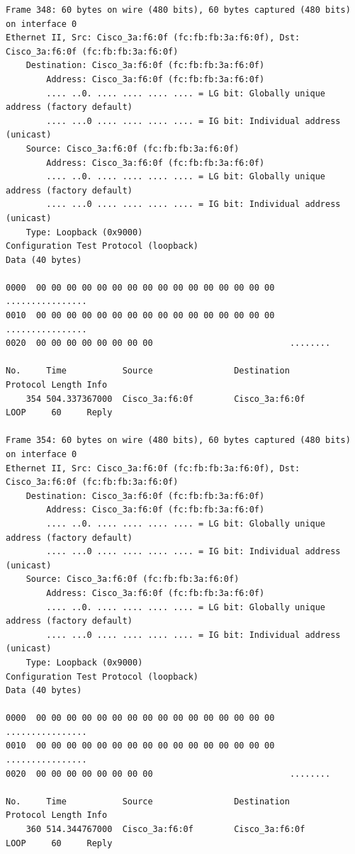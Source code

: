 \documentclass[a4paper,11pt]{article}
\begin{document}
\begin{lstlisting}
Frame 348: 60 bytes on wire (480 bits), 60 bytes captured (480 bits) on interface 0
Ethernet II, Src: Cisco_3a:f6:0f (fc:fb:fb:3a:f6:0f), Dst: Cisco_3a:f6:0f (fc:fb:fb:3a:f6:0f)
    Destination: Cisco_3a:f6:0f (fc:fb:fb:3a:f6:0f)
        Address: Cisco_3a:f6:0f (fc:fb:fb:3a:f6:0f)
        .... ..0. .... .... .... .... = LG bit: Globally unique address (factory default)
        .... ...0 .... .... .... .... = IG bit: Individual address (unicast)
    Source: Cisco_3a:f6:0f (fc:fb:fb:3a:f6:0f)
        Address: Cisco_3a:f6:0f (fc:fb:fb:3a:f6:0f)
        .... ..0. .... .... .... .... = LG bit: Globally unique address (factory default)
        .... ...0 .... .... .... .... = IG bit: Individual address (unicast)
    Type: Loopback (0x9000)
Configuration Test Protocol (loopback)
Data (40 bytes)

0000  00 00 00 00 00 00 00 00 00 00 00 00 00 00 00 00   ................
0010  00 00 00 00 00 00 00 00 00 00 00 00 00 00 00 00   ................
0020  00 00 00 00 00 00 00 00                           ........

No.     Time           Source                Destination           Protocol Length Info
    354 504.337367000  Cisco_3a:f6:0f        Cisco_3a:f6:0f        LOOP     60     Reply

Frame 354: 60 bytes on wire (480 bits), 60 bytes captured (480 bits) on interface 0
Ethernet II, Src: Cisco_3a:f6:0f (fc:fb:fb:3a:f6:0f), Dst: Cisco_3a:f6:0f (fc:fb:fb:3a:f6:0f)
    Destination: Cisco_3a:f6:0f (fc:fb:fb:3a:f6:0f)
        Address: Cisco_3a:f6:0f (fc:fb:fb:3a:f6:0f)
        .... ..0. .... .... .... .... = LG bit: Globally unique address (factory default)
        .... ...0 .... .... .... .... = IG bit: Individual address (unicast)
    Source: Cisco_3a:f6:0f (fc:fb:fb:3a:f6:0f)
        Address: Cisco_3a:f6:0f (fc:fb:fb:3a:f6:0f)
        .... ..0. .... .... .... .... = LG bit: Globally unique address (factory default)
        .... ...0 .... .... .... .... = IG bit: Individual address (unicast)
    Type: Loopback (0x9000)
Configuration Test Protocol (loopback)
Data (40 bytes)

0000  00 00 00 00 00 00 00 00 00 00 00 00 00 00 00 00   ................
0010  00 00 00 00 00 00 00 00 00 00 00 00 00 00 00 00   ................
0020  00 00 00 00 00 00 00 00                           ........

No.     Time           Source                Destination           Protocol Length Info
    360 514.344767000  Cisco_3a:f6:0f        Cisco_3a:f6:0f        LOOP     60     Reply


\end{lstlisting}
\end{document}
